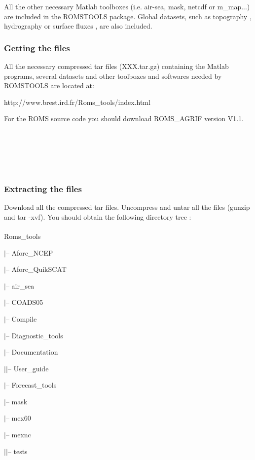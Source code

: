 All the other necessary Matlab toolboxes (i.e. air-sea, mask, 
netcdf or m\_map...) are included in the ROMSTOOLS package. 
Global datasets, such as topography \citep{Smi97}, 
hydrography \citep{Con02} or surface fluxes \citep{Das94}, are 
also included.

\subsubsection{Getting the files}

All the necessary compressed tar files (XXX.tar.gz) containing 
the Matlab programs, several datasets  and other toolboxes and 
softwares needed by ROMSTOOLS are located at:
\begin{center}
http://www.brest.ird.fr/Roms\_tools/index.html 
\end{center}
For the ROMS source code you should download ROMS\_AGRIF version 
V1.1.\\\\\\\\\\\\


\subsubsection{Extracting the files}

Download all the compressed tar files. Uncompress and untar all 
the files (gunzip and tar -xvf). You should obtain the following 
directory tree : \\
\\
Roms\_tools

$|$-- Aforc\_NCEP

$|$-- Aforc\_QuikSCAT

$|$-- air\_sea 

$|$-- COADS05  

$|$-- Compile

$|$-- Diagnostic\_tools

$|$-- Documentation

$|$\hspace{0.5cm}$|$-- User\_guide

$|$-- Forecast\_tools

$|$-- mask

$|$-- mex60

$|$-- mexnc

$|$\hspace{0.5cm}$|$-- tests


